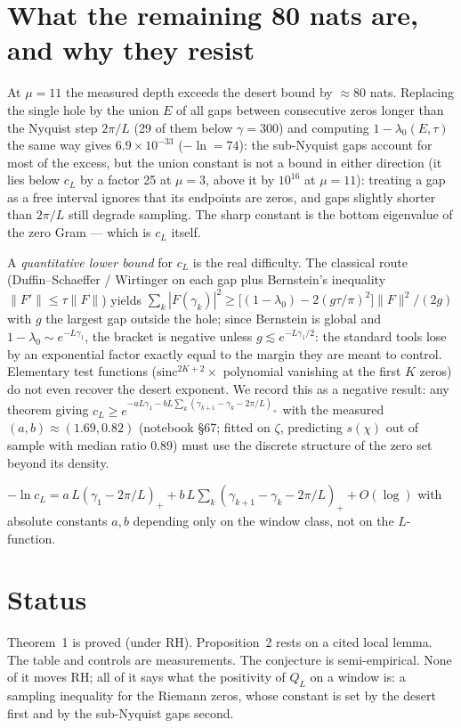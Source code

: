 \documentclass[11pt]{article}
\theoremstyle{remark}\newtheorem*{remark}{Remark}
\begin{document}
\section{What the remaining 80 nats are, and why they resist}
At $\mu=11$ the measured depth exceeds the desert bound by $\approx80$ nats. Replacing the single hole by the union $E$ of all gaps between consecutive zeros longer than the Nyquist step $2\pi/L$ (29 of them below $\gamma=300$) and computing $1-\lambda_0(E,\tau)$ the same way gives $6.9\times10^{-33}$ ($-\ln=74$): the sub-Nyquist gaps account for most of the excess, but the union constant is not a bound in either direction (it lies below $c_L$ by a factor 25 at $\mu=3$, above it by $10^{16}$ at $\mu=11$): treating a gap as a free interval ignores that its endpoints are zeros, and gaps slightly shorter than $2\pi/L$ still degrade sampling. The sharp constant is the bottom eigenvalue of the zero Gram --- which is $c_L$ itself.

A \emph{quantitative lower bound} for $c_L$ is the real difficulty. The classical route (Duffin--Schaeffer / Wirtinger on each gap plus Bernstein's inequality $\|F'\|\le\tau\|F\|$) yields
$\sum_k|F(\gamma_k)|^2\ge\bigl[(1-\lambda_0)-2(g\tau/\pi)^2\bigr]\|F\|^2/(2g)$ with $g$ the largest gap outside the hole; since Bernstein is global and $1-\lambda_0\sim e^{-L\gamma_1}$, the bracket is negative unless $g\lesssim e^{-L\gamma_1/2}$: the standard tools lose by an exponential factor exactly equal to the margin they are meant to control. Elementary test functions ($\mathrm{sinc}^{2K+2}\times$ polynomial vanishing at the first $K$ zeros) do not even recover the desert exponent. We record this as a negative result: any theorem giving $c_L\ge e^{-a L\gamma_1-bL\sum_k(\gamma_{k+1}-\gamma_k-2\pi/L)_+}$ with the measured $(a,b)\approx(1.69,0.82)$ (notebook \S67; fitted on $\zeta$, predicting $s(\chi)$ out of sample with median ratio $0.89$) must use the discrete structure of the zero set beyond its density.
\begin{conjecture}
$-\ln c_L= a\,L(\gamma_1-2\pi/L)_+ + b\,L\sum_k(\gamma_{k+1}-\gamma_k-2\pi/L)_+ + O(\log)$ with absolute constants $a,b$ depending only on the window class, not on the $L$-function.
\end{conjecture}

\section*{Status}
Theorem~1 is proved (under RH). Proposition~2 rests on a cited local lemma. The table and controls are measurements. The conjecture is semi-empirical. None of it moves RH; all of it says what the positivity of $Q_L$ on a window is: a sampling inequality for the Riemann zeros, whose constant is set by the desert first and by the sub-Nyquist gaps second.
\end{document}
